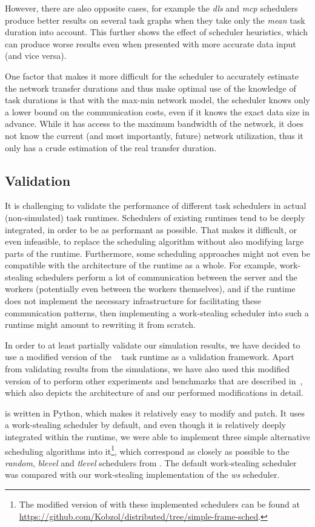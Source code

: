 However, there are also opposite cases, for example the \emph{dls} and
\emph{mcp} schedulers produce better results on several task graphs when they take
only the \emph{mean} task duration into account. This further shows the effect of
scheduler heuristics, which can produce worse results even when presented with more accurate data
input (and vice versa).

One factor that makes it more difficult for the scheduler to accurately estimate the network
transfer durations and thus make optimal use of the knowledge of task durations is that with the
max-min network model, the scheduler knows only a lower bound on the communication costs, even if
it knows the exact data size in advance. While it has access to the maximum bandwidth of the
network, it does not know the current (and most importantly, future) network utilization, thus it
only has a crude estimation of the real transfer duration.

\subsection{Validation}
It is challenging to validate the performance of different task schedulers in actual
(non-simulated) task runtimes. Schedulers of existing runtimes tend to be deeply integrated, in
order to be as performant as possible. That makes it difficult, or even infeasible, to replace the
scheduling algorithm without also modifying large parts of the runtime. Furthermore, some
scheduling approaches might not even be compatible with the architecture of the runtime as a whole.
For example, work-stealing schedulers perform a lot of communication between the server and the
workers (potentially even between the workers themselves), and if the runtime does not implement
the necessary infrastructure for facilitating these communication patterns, then implementing a
work-stealing scheduler into such a runtime might amount to rewriting it from scratch.

In order to at least partially validate our simulation results, we have decided to use a modified
version of the \dask{}~\cite{dask} task runtime as a validation
framework. Apart from validating results from the \estee{} simulations, we have also
used this modified version of \dask{} to perform other experiments and benchmarks
that are described in~, which also depicts the architecture of
\dask{} and our performed modifications in detail.

\dask{} is written in Python, which makes it relatively easy to modify and patch.
It uses a work-stealing scheduler by default, and even though it is relatively deeply integrated
within the \dask{} runtime, we were able to implement three simple alternative
scheduling algorithms into it\footnote{The modified version of \dask{} with these implemented schedulers can be found at
\url{https://github.com/Kobzol/distributed/tree/simple-frame-sched}.}, which correspond as closely as possible to
the \emph{random}, \emph{blevel} and \emph{tlevel} schedulers from
\estee{}. The default work-stealing scheduler was compared with our work-stealing
implementation of the \emph{ws} scheduler.

